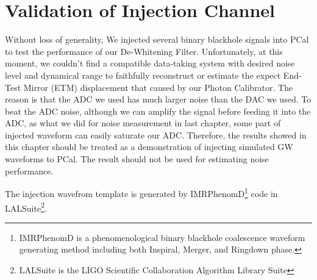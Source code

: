 




\chapter{Validation of Injection Channel}

Without loss of generality, We injected several binary blackhole signals into PCal to test the performance of our De-Whitening Filter. Unfortunately, at this moment, we couldn't find a compatible data-taking system with desired noise level and dynamical range to faithfully reconstruct or estimate the expect End-Test Mirror (ETM) displacement that caused by our Photon Calibrator. The reason is that the ADC we used has much larger noise than the DAC we used. To beat the ADC noise, although we can amplify the signal before feeding it into the ADC, as what we did for noise measurement in last chapter, some part of injected waveform can easily saturate our ADC. Therefore, the results showed in this chapter should be treated as a demonstration of injecting simulated GW waveforms to PCal. The result should not be used for estimating noise performance.

The injection wavefrom template is generated by IMRPhenomD\footnote{IMRPhenomD is a phenomenological binary blackhole coalescence waveform generating method including both Inspiral, Merger, and Ringdown phase.} code in LALSuite\footnote{LALSuite is the LIGO Scientific Collaboration Algorithm Library Suite}. 
 


  

